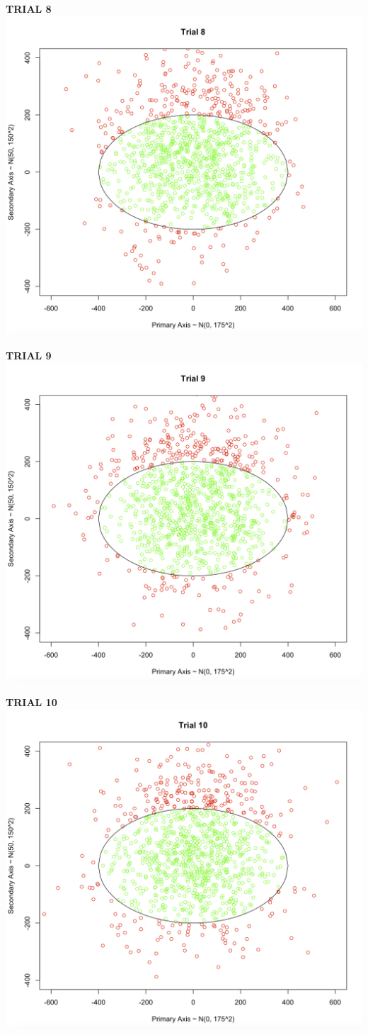 \documentclass[svgnames]{article}
\begin{document}
\textbf{TRIAL 8}
\newline
\includegraphics[scale=.35]{trial8}

\textbf{TRIAL 9}
\newline
\includegraphics[scale=.35]{trial9}

\textbf{TRIAL 10}
\newline
\includegraphics[scale=.35]{trial10}
\end{document}
